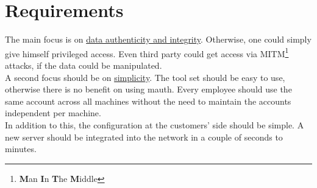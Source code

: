 %
%
%
%
%
%
%


\section{Requirements}

The main focus is on \ul{data authenticity and integrity}. Otherwise, one could
simply give himself privileged access. Even third party could get access via
MITM\footnote{\textbf{M}an \textbf{I}n \textbf{T}he \textbf{M}iddle} attacks, if
the data could be manipulated. \\

A second focus should be on \ul{simplicity}. The tool set should be easy to use,
otherwise there is no benefit on using mauth. Every employee should use the same
account across all machines without the need to maintain the accounts
independent per machine. \\

In addition to this, the configuration at the customers' side should be simple.
A new server should be integrated into the network in a couple of seconds to
minutes.
